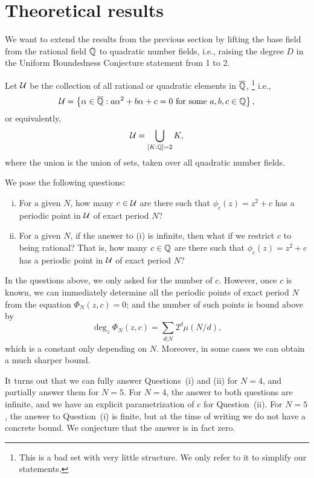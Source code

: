 \section{Theoretical results}
\label{sec:th}

We want to extend the results from the previous section by lifting the
base field from the rational field $\mathbb{Q}$ to quadratic number fields,
i.e., raising the degree $D$ in the Uniform Boundedness Conjecture
statement from 1 to 2.

Let $\mathcal{U}$ be the collection of all rational or quadratic elements in
$\overline{\mathbb{Q}}$,%
\footnote{This is a bad set with very little structure. We only refer
  to it to simplify our statements.}  i.e.,
\[
\mathcal{U} = \left\{\alpha \in \overline{\mathbb{Q}}: \text{$a \alpha^2 + b \alpha + c = 0$
    for some $a, b, c \in \mathbb{Q}$}\right\},
\]
or equivalently,
\[
\mathcal{U} = \bigcup_{[K : \mathbb{Q}] = 2}K,
\]
where the union is the union of sets, taken over all quadratic number
fields.

We pose the following questions:
\begin{enumerate}[(i)]
\item For a given $N$, how many $c \in \mathcal{U}$ are there such that
  $\phi_c(z) = z^2 + c$ has a periodic point in $\mathcal{U}$ of exact period
  $N$?

\item For a given $N$, if the answer to (i) is infinite, then what if
  we restrict $c$ to being rational? That is, how many $c \in \mathbb{Q}$ are
  there such that $\phi_c(z) = z^2 + c$ has a periodic point in $\mathcal{U}$
  of exact period $N$?
\end{enumerate}

\begin{remark}
  In the questions above, we only asked for the number of
  $c$. However, once $c$ is known, we can immediately determine all
  the periodic points of exact period $N$ from the equation $\Phi_N(z,
  c) = 0$; and the number of such points is bound above by
  \[
  \deg_z \Phi_N(z, c) = \sum_{d|N}2^d \mu(N/d),
  \]
  which is a constant only depending on $N$. Moreover,
  in some cases we can obtain a much sharper bound.
\end{remark}

It turns out that we can fully answer Questions~(i) and (ii) for $N =
4$, and partially answer them for $N = 5$. For $N = 4$, the answer to
both questions are infinite, and we have an explicit parametrization
of $c$ for Question~(ii). For $N = 5$, the answer to Question~(i) is
finite, but at the time of writing we do not have a concrete bound. We
conjecture that the answer is in fact zero.


